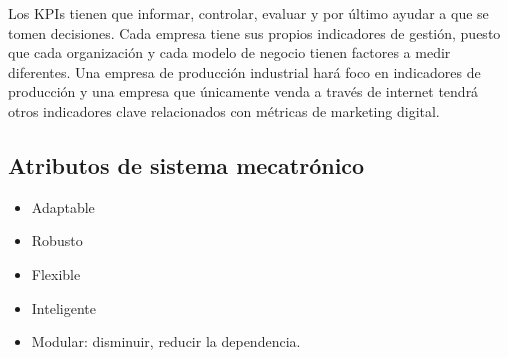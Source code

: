 Los KPIs tienen que informar, controlar, evaluar y por último ayudar a que se tomen decisiones. Cada empresa tiene sus propios indicadores de gestión, puesto que cada organización y cada modelo de negocio tienen factores a medir diferentes. Una empresa de producción industrial hará foco en indicadores de producción y una empresa que únicamente venda a través de internet tendrá otros indicadores clave relacionados con métricas de marketing digital. 

\subsection{Atributos de sistema mecatrónico}
\begin{itemize}
    \item Adaptable
    \item Robusto
    \item Flexible 
    \item Inteligente 
    \item Modular: disminuir, reducir la dependencia. 
\end{itemize}